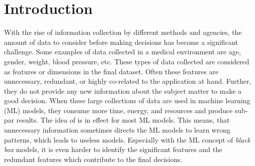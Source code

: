 
    






% 
% 


% 

\newpage
\section{Introduction}
With the rise of information collection by different methods and agencies, the amount of data to consider before making decisions has become a significant challenge. Some examples of data collected in a medical environment are age, gender, weight, blood pressure, etc. These types of data collected are considered as features or dimensions in the final dataset. Often these features are unnecessary, redundant, or highly co-related to the application at hand. Further, they do not provide any new information about the subject matter to make a good decision. When these large collections of data are used in machine learning (ML) models, they consume more time, energy, and resources and produce sub-par results. The idea of  is in effect for most ML models. This means, that unnecessary information sometimes directs the ML models to learn wrong patterns, which leads to useless models.  Especially with the ML concept of \textit{black box} models, it is even harder to identify the significant features and the redundant features which contribute to the final decisions.


